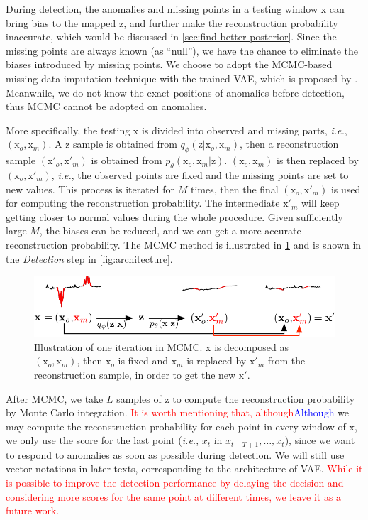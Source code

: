 \documentclass[sigconf]{acmart}
\newcommand\compactdel[1]{{\textcolor{red}{#1}}}
\newcommand\compactsub[2]{{\textcolor{red}{#1}}{\textcolor{blue}{#2}}}
\newcommand\compactdel[1]{}
\newcommand\compactsub[2]{#2}
\newcommand\compactdel[1]{#1}
\newcommand\compactsub[2]{#1}
\newcommand{\IE}{\textit{i.e.}}
\newcommand{\vv}[1]{\bm{\mathrm{{#1}}}}
\begin{document}
During detection, the anomalies and missing points in a testing window $\vv{x}$ can bring bias to the mapped $\vv{z}$, and further make the reconstruction probability inaccurate, which would be discussed in \cref{sec:find-better-posterior}.
Since the missing points are always known (as ``null''), we have the chance to eliminate the biases introduced by missing points.
We choose to adopt the MCMC-based missing data imputation technique with the trained VAE, which is proposed by \cite{rezende_stochastic_2014}.
Meanwhile, we do not know the exact positions of anomalies before detection, thus MCMC cannot be adopted on anomalies.

More specifically, the testing $\vv{x}$ is divided into observed and missing parts, \IE, $(\vv{x}_o, \vv{x}_m)$.
A $\vv{z}$ sample is obtained from $q_{\phi}(\vv{z}|\vv{x}_o,\vv{x}_m)$, then a reconstruction sample $(\vv{x}'_o, \vv{x}'_m)$ is obtained from $p_{\theta}(\vv{x}_o,\vv{x}_m|\vv{z})$.
$(\vv{x}_o, \vv{x}_m)$ is then replaced by $(\vv{x}_o, \vv{x}'_m)$, \IE, the observed points are fixed and the missing points are set to new values.
This process is iterated for $M$ times, then the final $(\vv{x}_o, \vv{x}'_m)$ is used for computing the reconstruction probability.
The intermediate $\vv{x}'_m$ will keep getting closer to normal values during the whole procedure.
Given sufficiently large $M$, the biases can be reduced, and we can get a more accurate reconstruction probability.
The MCMC method is illustrated in \cref{fig:mcmc-illustration} and is shown in  the \textit{Detection} step in \cref{fig:architecture}.

\begin{figure}
	\centering
	\includegraphics[width=\columnwidth]{mcmc-illustration}
	\caption{
		Illustration of one iteration in MCMC.
		$\vv{x}$ is decomposed as $(\vv{x}_o,\vv{x}_m)$, then $\vv{x}_o$ is fixed and $\vv{x}_m$ is replaced by $\vv{x}'_m$ from the reconstruction sample, in order to get the new $\vv{x}'$.
	}\label{fig:mcmc-illustration}
\end{figure}

After MCMC, we take $L$ samples of $\vv{z}$ to compute the reconstruction probability by Monte Carlo integration.
\compactsub{It is worth mentioning that, although}{Although} we may compute the reconstruction probability for each point in every window of $\vv{x}$, we only use the score for the last point (\IE, $x_t$ in $x_{t-T+1},\dots,x_t$), since we want to respond to anomalies as soon as possible during detection.
We will still use vector notations in later texts, corresponding to the architecture of VAE.
\compactdel{While it is possible to improve the detection performance by delaying the decision and considering more scores for the same point at different times, we leave it as a future work.}
\end{document}
